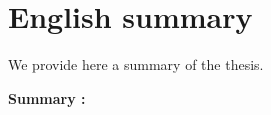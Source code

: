 \chapter{English summary}
\label{app:fr_small}

We provide here a summary of the thesis.

\textbf{Summary :}

\todomarker{}